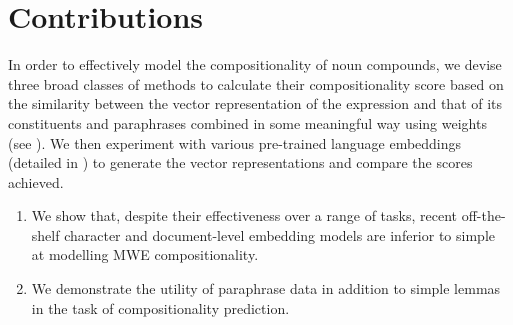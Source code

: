 \section{Contributions}
In order to effectively model the compositionality of  noun compounds, we devise three broad classes of methods to calculate their compositionality score based on the similarity between the vector representation of the expression and that of its constituents and paraphrases combined in some meaningful way using weights (see ). We then experiment with various pre-trained language embeddings (detailed in ) to generate the vector representations and compare the scores achieved.
\begin{enumerate}
    \item We show that, despite their effectiveness over a range of tasks, recent off-the-shelf character and document-level embedding models are inferior to simple \wordtovec at modelling MWE compositionality.
    \item We demonstrate the utility of paraphrase data in addition to simple lemmas in the task of compositionality prediction.
\end{enumerate}

